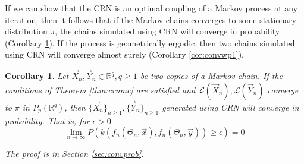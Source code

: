 \documentclass[12pt]{article}
\theoremstyle{plain}%
\newtheorem{cor}{Corollary}
\theoremstyle{definition}
\begin{document}
	If we can show that the CRN is an optimal coupling of a Markov process at any iteration, then it follows that if the Markov chains converges to some stationary distribution $\pi$,  the chains simulated using CRN will converge in probability (Corollary \ref{cor:convprob}). If the process is geometrically ergodic, then two chains simulated using CRN will converge almost surely (Corollary \ref{cor:convwp1}). 
	\begin{cor}\label{cor:convprob}
		Let $\vec{X}_n,\vec{Y}_n\in \mathbb{R}^q, q\geq 1$ be two copies of a Markov chain. If the conditions of Theorem \ref{thm:crnmc} are satisfied and $\mathcal{L}(\vec{X}_n),\mathcal{L}(\vec{Y}_n)$ converge to $\pi$ in $P_p(\mathbb{R}^q)$, then $\{\vec{X}_n\}_{n\geq 1}, \{\vec{Y}_n\}_{n\geq 1}$ generated using CRN will converge in probability. That is, for $\epsilon>0$
		$$\lim_{n\to \infty}P(k(f_n(\Theta_n,\vec{x}),f_n(\Theta_n,\vec{y}))\geq \epsilon)= 0$$
		
		The proof is in Section \ref{sec:convprob}.
	\end{cor}
\end{document}
